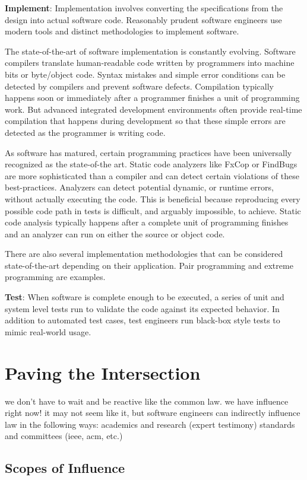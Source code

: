 \documentclass[12pt]{report}
\begin{document}
\textbf{Implement}: Implementation involves converting the specifications from the design into actual software code. Reasonably prudent software engineers use modern tools and distinct methodologies to implement software.

The state-of-the-art of software implementation is constantly evolving. Software compilers translate human-readable code written by programmers into machine bits or byte/object code. Syntax mistakes and simple error conditions can be detected by compilers and prevent software defects. Compilation typically happens soon or immediately after a programmer finishes a unit of programming work. But advanced integrated development environments often provide real-time compilation that happens during development so that these simple errors are detected as the programmer is writing code. 

As software has matured, certain programming practices have been universally recognized as the state-of-the art. Static code analyzers like FxCop or FindBugs are more sophisticated than a compiler and can detect certain violations of these best-practices. Analyzers can detect potential dynamic, or runtime errors, without actually executing the code. This is beneficial because reproducing every possible code path in tests is difficult, and arguably impossible, to achieve. Static code analysis typically happens after a complete unit of programming finishes and an analyzer can run on either the source or object code.

There are also several implementation methodologies that can be considered state-of-the-art depending on their application. Pair programming and extreme programming are examples.

\textbf{Test}: When software is complete enough to be executed, a series of unit and system level tests run to validate the code against its expected behavior. In  addition to automated test cases, test engineers run black-box style tests to mimic real-world usage. 

\chapter{Paving the Intersection} 
we don't have to wait and be reactive like the common law. we have influence right now! it may not seem like it, but software engineers can indirectly influence law in the following ways: 
academics and research (expert testimony) 
standards and committees (ieee, acm, etc.) 

\section{Scopes of Influence} 
\end{document}
